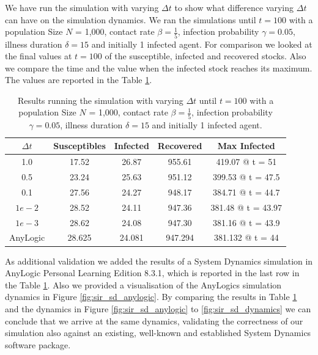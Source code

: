 We have run the simulation with varying $\Delta t$ to show what difference varying $\Delta t$ can have on the simulation dynamics. We ran the simulations until $t = 100$ with a population Size $N$ = 1,000, contact rate $\beta = \frac{1}{5}$, infection probability $\gamma = 0.05$, illness duration $\delta = 15$ and initially 1 infected agent. For comparison we looked at the final values at $t = 100$ of the susceptible, infected and recovered stocks. Also we compare the time and the value when the infected stock reaches its maximum. The values are reported in the Table \ref{tab:delta_influence}.

\begin{table}
  \centering
  \begin{tabular}{ c || c | c | c | c }
    $\Delta t$ & Susceptibles & Infected & Recovered & Max Infected \\ \hline \hline 
    1.0 & 17.52 & 26.87 & 955.61 & 419.07 @ t = 51 \\ \hline
    0.5 & 23.24 & 25.63 & 951.12 & 399.53 @ t = 47.5 \\ \hline
    0.1 & 27.56 & 24.27 & 948.17 & 384.71 @ t = 44.7 \\ \hline
    $1e-2$ & 28.52 & 24.11 & 947.36 & 381.48 @ t = 43.97 \\ \hline
    $1e-3$ & 28.62 & 24.08 & 947.30 & 381.16 @ t = 43.9  \\ \hline \hline
    AnyLogic & 28.625 & 24.081 & 947.294 & 381.132 @ t = 44
    
  \end{tabular}
  \caption{Results running the simulation with varying $\Delta t$ until $t = 100$ with a population Size $N$ = 1,000, contact rate $\beta = \frac{1}{5}$, infection probability $\gamma = 0.05$, illness duration $\delta = 15$ and initially 1 infected agent.}
  \label{tab:delta_influence}
\end{table}

As additional validation we added the results of a System Dynamics simulation in AnyLogic Personal Learning Edition 8.3.1, which is reported in the last row in the Table \ref{tab:delta_influence}. Also we provided a visualisation of the AnyLogics simulation dynamics in Figure \ref{fig:sir_sd_anylogic}. By comparing the results in Table \ref{tab:delta_influence} and the dynamics in Figure \ref{fig:sir_sd_anylogic} to \ref{fig:sir_sd_dynamics} we can conclude that we arrive at the same dynamics, validating the correctness of our simulation also against an existing, well-known and established System Dynamics software package.

